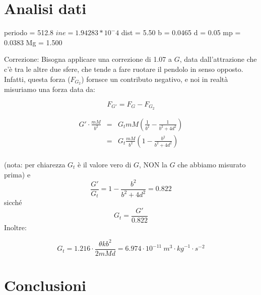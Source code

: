 \section{Analisi dati} 

periodo = 512.8
$ine = 1.94283*10^-4$
dist = 5.50
b = 0.0465
d = 0.05
mp = 0.0383
Mg = 1.500

Correzione:
Bisogna applicare una correzione di 1.07 a $G$, data dall'attrazione che c'è tra le altre due sfere, che tende a fare ruotare il pendolo in senso opposto. Infatti, questa forza ($F_{G_2}$) fornsce un contributo negativo, e noi in realtà misuriamo una forza data da:

$$ F_{G'} = F_G - F_{G_2} $$

\begin{eqnarray*}
G'\cdot\frac{mM}{b^2} & = & G_tmM(\frac{1}{b^2} - \frac{1}{b^2+4d^2}) \\
                      & = & G_t\frac{mM}{b^2}(1 - \frac{b^2}{b^2+4d^2}) \\
\end{eqnarray*}

(nota: per chiarezza $G_t$ è il valore vero di $G$, NON la $G$ che abbiamo misurato prima)
e
$$ \frac{G'}{G_t} = 1-\frac{b^2}{b^2+4d^2} = 0.822$$
sicché
$$ G_t = \frac{G'}{0.822}$$
Inoltre:

$$ G_t = 1.216\cdot \frac{\theta k b^2}{2mMd} = 6.974\cdot 10^{-11}\ {m}^3\cdot {kg}^{-1}\cdot{s}^{-2}$$

\section{Conclusioni}
